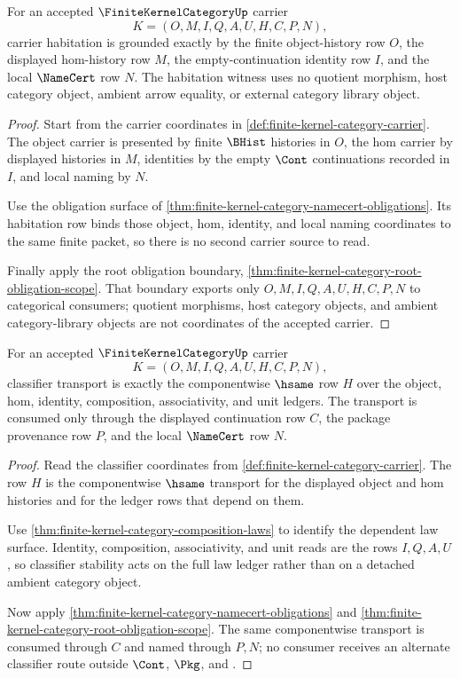 \begin{theorem}
\label{thm:finite-kernel-category-carrier-habitation-scope}
For an accepted $\FiniteKernelCategoryUp$ carrier
$$
K=(O,M,I,Q,A,U,H,C,P,N),
$$
carrier habitation is grounded exactly by the finite object-history row $O$,
the displayed hom-history row $M$, the empty-continuation identity row $I$,
and the local $\NameCert$ row $N$. The habitation witness uses no quotient
morphism, host category object, ambient arrow equality, or external category
library object.
\end{theorem}
\begin{proof}
Start from the carrier coordinates in
\autoref{def:finite-kernel-category-carrier}. The object carrier is presented
by finite $\BHist$ histories in $O$, the hom carrier by displayed histories in
$M$, identities by the empty $\Cont$ continuations recorded in $I$, and local
naming by $N$.

Use the obligation surface of
\autoref{thm:finite-kernel-category-namecert-obligations}. Its habitation row
binds those object, hom, identity, and local naming coordinates to the same
finite packet, so there is no second carrier source to read.

Finally apply the root obligation boundary,
\autoref{thm:finite-kernel-category-root-obligation-scope}. That boundary
exports only $O,M,I,Q,A,U,H,C,P,N$ to categorical consumers; quotient
morphisms, host category objects, and ambient category-library objects are not
coordinates of the accepted carrier.
\end{proof}

\begin{theorem}
\label{thm:finite-kernel-category-classifier-stability-scope}
For an accepted $\FiniteKernelCategoryUp$ carrier
$$
K=(O,M,I,Q,A,U,H,C,P,N),
$$
classifier transport is exactly the componentwise $\hsame$ row $H$ over the
object, hom, identity, composition, associativity, and unit ledgers. The
transport is consumed only through the displayed continuation row $C$, the
package provenance row $P$, and the local $\NameCert$ row $N$.
\end{theorem}
\begin{proof}
Read the classifier coordinates from
\autoref{def:finite-kernel-category-carrier}. The row $H$ is the
componentwise $\hsame$ transport for the displayed object and hom histories
and for the ledger rows that depend on them.

Use \autoref{thm:finite-kernel-category-composition-laws} to identify the
dependent law surface. Identity, composition, associativity, and unit reads
are the rows $I,Q,A,U$, so classifier stability acts on the full law ledger
rather than on a detached ambient category object.

Now apply \autoref{thm:finite-kernel-category-namecert-obligations} and
\autoref{thm:finite-kernel-category-root-obligation-scope}. The same
componentwise transport is consumed through $C$ and named through $P,N$; no
consumer receives an alternate classifier route outside $\Cont$, $\Pkg$, and
\NameCert.
\end{proof}

